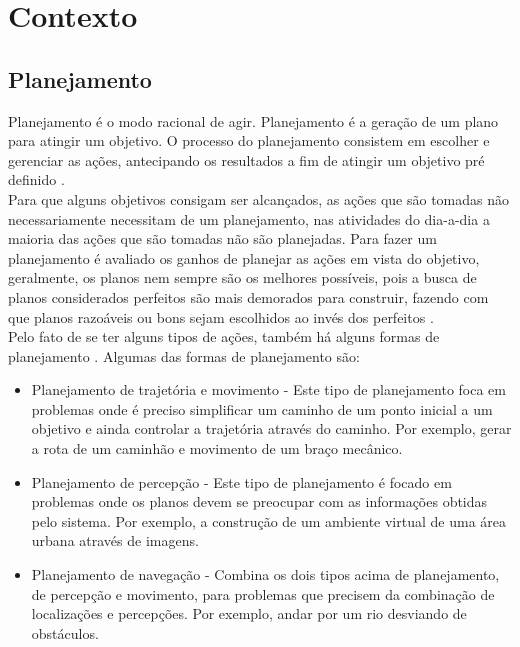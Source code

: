 \chapter{\label{chap:conte}Contexto}


\section{Planejamento} 

Planejamento é o modo racional de agir. Planejamento é a geração de um plano para atingir um objetivo. O processo do planejamento consistem em escolher e gerenciar as ações, antecipando os resultados a fim de atingir um objetivo pré definido \cite{ghallab2004automated}. \\
Para que alguns objetivos consigam ser alcançados, as ações que são tomadas não necessariamente necessitam de um planejamento, nas atividades do dia-a-dia a maioria das ações que são tomadas não são planejadas. Para fazer um planejamento é avaliado os ganhos de planejar as ações em vista do objetivo, geralmente, os planos nem sempre são os melhores possíveis, pois a busca de planos considerados perfeitos são mais demorados para construir, fazendo com que planos razoáveis ou bons sejam escolhidos ao invés dos perfeitos \cite{ghallab2004automated}. \\
Pelo fato de se ter alguns tipos de ações, também há alguns formas de planejamento \cite{ghallab2004automated}. Algumas das formas de planejamento são:

\begin{itemize}
	\item Planejamento de trajetória e movimento - Este tipo de planejamento foca em problemas onde é preciso simplificar um caminho de um ponto inicial a um objetivo e ainda controlar a trajetória através do caminho. Por exemplo, gerar a rota de um caminhão e movimento de um braço mecânico. 
	\item Planejamento de percepção - Este tipo de planejamento é focado em problemas onde os planos devem se preocupar com as informações obtidas pelo sistema. Por exemplo,  a construção de um ambiente virtual de uma área urbana através de imagens. 
	\item Planejamento de navegação - Combina os dois tipos acima de planejamento, de percepção e movimento, para problemas que precisem da combinação de localizações e percepções. Por exemplo, andar por um rio desviando de obstáculos.  
\end{itemize}


